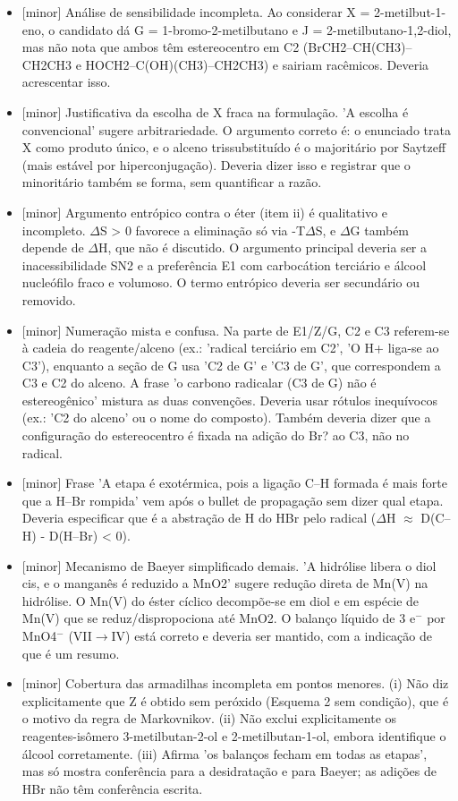 \documentclass{article}%
\begin{document}
\begin{itemize}%
\item%
{[}minor{]} Análise de sensibilidade incompleta. Ao considerar X = 2{-}metilbut{-}1{-}eno, o candidato dá G = 1{-}bromo{-}2{-}metilbutano e J = 2{-}metilbutano{-}1,2{-}diol, mas não nota que ambos têm estereocentro em C2 (BrCH2--CH(CH3)--CH2CH3 e HOCH2--C(OH)(CH3)--CH2CH3) e sairiam racêmicos. Deveria acrescentar isso.%
\item%
{[}minor{]} Justificativa da escolha de X fraca na formulação. 'A escolha é convencional' sugere arbitrariedade. O argumento correto é: o enunciado trata X como produto único, e o alceno trissubstituído é o majoritário por Saytzeff (mais estável por hiperconjugação). Deveria dizer isso e registrar que o minoritário também se forma, sem quantificar a razão.%
\item%
{[}minor{]} Argumento entrópico contra o éter (item ii) é qualitativo e incompleto. $\Delta$S > 0 favorece a eliminação só via -T$\Delta$S, e $\Delta$G também depende de $\Delta$H, que não é discutido. O argumento principal deveria ser a inacessibilidade SN2 e a preferência E1 com carbocátion terciário e álcool nucleófilo fraco e volumoso. O termo entrópico deveria ser secundário ou removido.%
\item%
{[}minor{]} Numeração mista e confusa. Na parte de E1/Z/G, C2 e C3 referem{-}se à cadeia do reagente/alceno (ex.: 'radical terciário em C2', 'O H+ liga{-}se ao C3'), enquanto a seção de G usa 'C2 de G' e 'C3 de G', que correspondem a C3 e C2 do alceno. A frase 'o carbono radicalar (C3 de G) não é estereogênico' mistura as duas convenções. Deveria usar rótulos inequívocos (ex.: 'C2 do alceno' ou o nome do composto). Também deveria dizer que a configuração do estereocentro é fixada na adição do Br? ao C3, não no radical.%
\item%
{[}minor{]} Frase 'A etapa é exotérmica, pois a ligação C--H formada é mais forte que a H--Br rompida' vem após o bullet de propagação sem dizer qual etapa. Deveria especificar que é a abstração de H do HBr pelo radical ($\Delta$H $\approx$ D(C--H) - D(H--Br) < 0).%
\item%
{[}minor{]} Mecanismo de Baeyer simplificado demais. 'A hidrólise libera o diol cis, e o manganês é reduzido a MnO2' sugere redução direta de Mn(V) na hidrólise. O Mn(V) do éster cíclico decompõe{-}se em diol e em espécie de Mn(V) que se reduz/dispropociona até MnO2. O balanço líquido de 3 e$^{-}$ por MnO4$^{-}$ (VII$\to$IV) está correto e deveria ser mantido, com a indicação de que é um resumo.%
\item%
{[}minor{]} Cobertura das armadilhas incompleta em pontos menores. (i) Não diz explicitamente que Z é obtido sem peróxido (Esquema 2 sem condição), que é o motivo da regra de Markovnikov. (ii) Não exclui explicitamente os reagentes{-}isômero 3{-}metilbutan{-}2{-}ol e 2{-}metilbutan{-}1{-}ol, embora identifique o álcool corretamente. (iii) Afirma 'os balanços fecham em todas as etapas', mas só mostra conferência para a desidratação e para Baeyer; as adições de HBr não têm conferência escrita.%
\end{itemize}%
\end{document}
